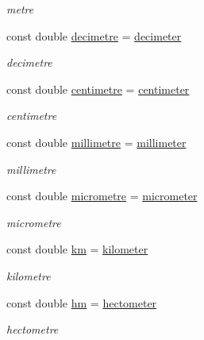 \begin{DoxyCompactItemize}
\begin{DoxyCompactList}\small\item\em metre \end{DoxyCompactList}\item 
const double \hyperlink{namespace_utilities_acd1e513cc56efd8a5f237271a46afcfe}{decimetre} = \hyperlink{namespace_utilities_a66145380051759756714059815f45e18}{decimeter}
\begin{DoxyCompactList}\small\item\em decimetre \end{DoxyCompactList}\item 
const double \hyperlink{namespace_utilities_a8f332608b463f7e22df3b1120be2cba2}{centimetre} = \hyperlink{namespace_utilities_a17483d8b3688f5a3786b48f4ed70588c}{centimeter}
\begin{DoxyCompactList}\small\item\em centimetre \end{DoxyCompactList}\item 
const double \hyperlink{namespace_utilities_a8a754864202e3b90c9f70df567799d24}{millimetre} = \hyperlink{namespace_utilities_ae8c7101098fba61f862817a083c422ca}{millimeter}
\begin{DoxyCompactList}\small\item\em millimetre \end{DoxyCompactList}\item 
const double \hyperlink{namespace_utilities_a6d2f4eead5bcae530f7c08291bf86931}{micrometre} = \hyperlink{namespace_utilities_a99dfe40c94af0523293210aaf01a0435}{micrometer}
\begin{DoxyCompactList}\small\item\em micrometre \end{DoxyCompactList}\item 
const double \hyperlink{namespace_utilities_a4e01876aaa4c4d98bcbf9526e980d996}{km} = \hyperlink{namespace_utilities_a06654149ce3cba96084c785b079a7a31}{kilometer}
\begin{DoxyCompactList}\small\item\em kilometre \end{DoxyCompactList}\item 
const double \hyperlink{namespace_utilities_aacdd5d6ef494c74b5292a3966a1bd5e7}{hm} = \hyperlink{namespace_utilities_a3fb2d462bd1e7dc8fe4dbc1ad4f28ff3}{hectometer}
\begin{DoxyCompactList}\small\item\em hectometre \end{DoxyCompactList}\item 

\end{DoxyCompactItemize}
